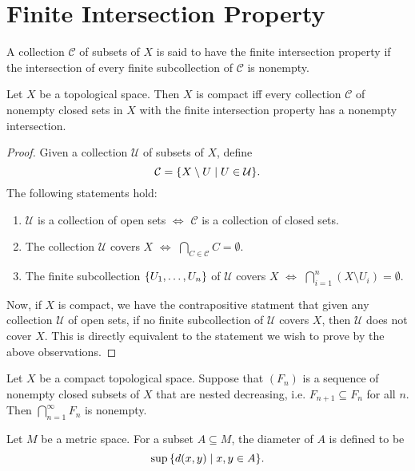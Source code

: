 \section{Finite Intersection Property}

\begin{df}
    A collection $\mathcal C$ of subsets of $X$ is said to have the finite intersection property if the intersection of every finite subcollection of $\mathcal C$ is nonempty.
\end{df}

\begin{thm}
    Let $X$ be a topological space. Then $X$ is compact iff every collection $\mathcal C$ of nonempty closed sets in $X$ with the finite intersection property has a nonempty intersection.
    \begin{proof}
        Given a collection $\mathcal U$ of subsets of $X$, define
        \[
        \mathcal C = {\left\{{X \setminus U \mid U\in \mathcal U}\right\}}.
        \]
        The following statements hold:
        \begin{enumerate}
            \item $\mathcal U$ is a collection of open sets $\iff$ $\mathcal C$ is a collection of closed sets.
            \item The collection $\mathcal U$ covers $X$ $\iff$ $\bigcap_{C\in \mathcal C} C = \emptyset$.
            \item The finite subcollection ${\left\{{U_1, \ldots, U_n}\right\}}$ of $\mathcal U$ covers $X$ $\iff$ $\bigcap_{i=1}^n (X\setminus U_i) = \emptyset$.
        \end{enumerate}
        Now, if $X$ is compact, we have the contrapositive statment that given any collection $\mathcal U$ of open sets, if no finite subcollection of $\mathcal U$ covers $X$, then $\mathcal U$ does not cover $X$. This is directly equivalent to the statement we wish to prove by the above observations.
    \end{proof}
\end{thm}

\begin{cl}
    Let $X$ be a compact topological space. Suppose that $(F_n)$ is a sequence of nonempty closed subsets of $X$ that are nested decreasing, i.e. $F_{n+1} \subseteq F_n$ for all $n$. Then $\bigcap_{n=1}^\infty F_n$ is nonempty.
\end{cl}

\begin{df}
    Let $M$ be a metric space. For a subset $A \subseteq M$, the diameter of $A$ is defined to be
    \[
    \sup {\left\{{d(x, y) \mid x, y \in A}\right\}}.
    \]
\end{df}

